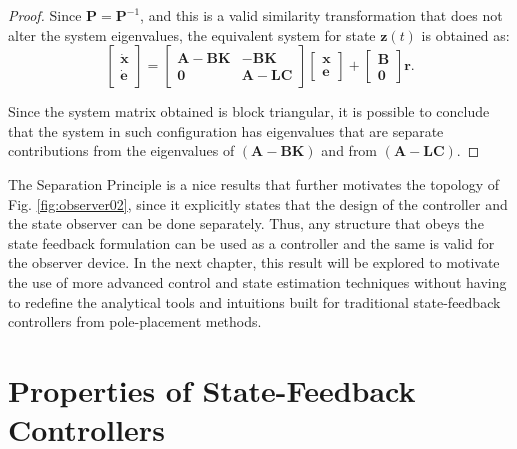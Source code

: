 \documentclass[a4paper,11pt]{book}
\numberwithin{figure}{chapter}
\numberwithin{equation}{chapter}
\numberwithin{table}{chapter}
\theoremstyle{definition}
\begin{document}
\begin{proof}
Since $\bm{P} = \bm{P}^{-1}$, and this is a valid similarity transformation that does not alter the system eigenvalues, the equivalent system for state $\bm{z}(t)$ is obtained as:
\begin{equation}
    \begin{bmatrix} \dot{\bm{x}} \\ \dot{\bm{e}}    \end{bmatrix}
    =
    \begin{bmatrix}
        \bm{A} - \bm{B} \bm{K} & - \bm{B} \bm{K} \\
        \bm{0} & \bm{A} - \bm{L} \bm{C}
    \end{bmatrix} \begin{bmatrix} \bm{x} \\ \bm{e} \end{bmatrix}
    +
    \begin{bmatrix} \bm{B} \\ \bm{0} \end{bmatrix} \bm{r}
.\end{equation} \vskip0.2cm

Since the system matrix obtained is block triangular, it is possible to conclude that the system in such configuration has eigenvalues that are separate contributions from the eigenvalues of $\left( \bm{A} - \bm{B} \bm{K} \right)$ and from $\left( \bm{A} - \bm{L} \bm{C} \right)$.
\end{proof}

The Separation Principle is a nice results that further motivates the topology of Fig. \ref{fig:observer02}, since it explicitly states that the design of the controller and the state observer can be done separately. Thus, any structure that obeys the state feedback formulation can be used as a controller and the same is valid for the observer device. In the next chapter, this result will be explored to motivate the use of more advanced control and state estimation techniques without having to redefine the analytical tools and intuitions built for traditional state-feedback controllers from pole-placement methods.

\section{Properties of State-Feedback Controllers}
\end{document}
